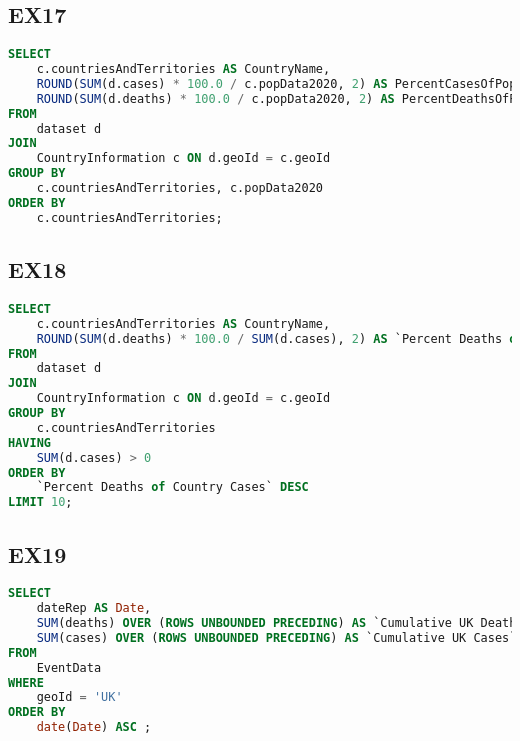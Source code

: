 \documentclass[10pt]{article}
\begin{document}
\subsection{EX17}
\begin{lstlisting}[language=SQL]
SELECT
    c.countriesAndTerritories AS CountryName,
    ROUND(SUM(d.cases) * 100.0 / c.popData2020, 2) AS PercentCasesOfPopulation,
    ROUND(SUM(d.deaths) * 100.0 / c.popData2020, 2) AS PercentDeathsOfPopulation
FROM
    dataset d
JOIN
    CountryInformation c ON d.geoId = c.geoId
GROUP BY
    c.countriesAndTerritories, c.popData2020
ORDER BY
    c.countriesAndTerritories;
\end{lstlisting}


\subsection{EX18}
\begin{lstlisting}[language=SQL]
SELECT
    c.countriesAndTerritories AS CountryName,
    ROUND(SUM(d.deaths) * 100.0 / SUM(d.cases), 2) AS `Percent Deaths of Country Cases`
FROM
    dataset d
JOIN
    CountryInformation c ON d.geoId = c.geoId
GROUP BY
    c.countriesAndTerritories
HAVING
    SUM(d.cases) > 0
ORDER BY
    `Percent Deaths of Country Cases` DESC
LIMIT 10;

\end{lstlisting}

\subsection{EX19}
\begin{lstlisting}[language=SQL]
SELECT
    dateRep AS Date,
    SUM(deaths) OVER (ROWS UNBOUNDED PRECEDING) AS `Cumulative UK Deaths`,
    SUM(cases) OVER (ROWS UNBOUNDED PRECEDING) AS `Cumulative UK Cases`
FROM
    EventData
WHERE
    geoId = 'UK'
ORDER BY
    date(Date) ASC ;

\end{lstlisting}
\end{document}
